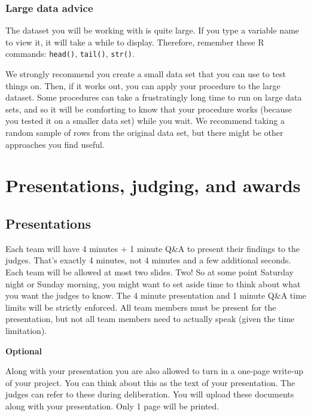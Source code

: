 \documentclass[]{article}
\begin{document}
\hypertarget{large-data-advice}{%
\subsubsection{Large data advice}\label{large-data-advice}}

The dataset you will be working with is quite large. If you type a
variable name to view it, it will take a while to display. Therefore,
remember these R commands: \texttt{head()}, \texttt{tail()},
\texttt{str()}.

We strongly recommend you create a small data set that you can use to
test things on. Then, if it works out, you can apply your procedure to
the large dataset. Some procedures can take a frustratingly long time to
run on large data sets, and so it will be comforting to know that your
procedure works (because you tested it on a smaller data set) while you
wait. We recommend taking a random sample of rows from the original data
set, but there might be other approaches you find useful.

\hypertarget{presentations-judging-and-awards}{%
\section{Presentations, judging, and
awards}\label{presentations-judging-and-awards}}

\hypertarget{presentations}{%
\subsection{Presentations}\label{presentations}}

Each team will have 4 minutes + 1 minute Q\&A to present their findings
to the judges. That's exactly 4 minutes, not 4 minutes and a few
additional seconds. Each team will be allowed at most two slides. Two!
So at some point Saturday night or Sunday morning, you might want to set
aside time to think about what you want the judges to know. The 4 minute
presentation and 1 minute Q\&A time limits will be strictly enforced.
All team members must be present for the presentation, but not all team
members need to actually speak (given the time limitation).

\textbf{Optional}

Along with your presentation you are also allowed to turn in a one-page
write-up of your project. You can think about this as the text of your
presentation. The judges can refer to these during deliberation. You
will upload these documents along with your presentation. Only 1 page
will be printed.
\end{document}
